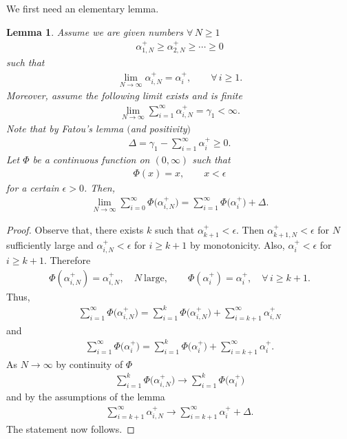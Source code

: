 \documentclass[11pt]{article}
\numberwithin{equation}{section}
\newtheorem{Lemma}[Theorem]{Lemma}
\begin{document}
We first need an elementary lemma.
\begin{Lemma}Assume we are given numbers $\forall\, N \ge 1$
\begin{gather*}
\alpha_{1,N}^+\ge \alpha_{2,N}^+\ge \cdots \ge 0
\end{gather*}
such that
\begin{gather*}
\lim_{N \to \infty}\alpha_{i,N}^+=\alpha_i^+, \qquad \forall\, i\ge 1.
\end{gather*}
Moreover, assume the following limit exists and is finite
\begin{gather*}
\lim_{N\to \infty} \sum_{i=1}^{\infty}\alpha_{i,N}^+=\gamma_1<\infty.
\end{gather*}
Note that by Fatou's lemma $($and positivity$)$
\begin{gather*}
\Delta=\gamma_1-\sum_{i=1}^{\infty}\alpha_i^+\ge 0.
\end{gather*}
Let $\Phi$ be a continuous function on $(0,\infty)$ such that
\begin{gather*}
\Phi(x)=x, \qquad x<\epsilon
\end{gather*}
for a certain $\epsilon>0$. Then,
\begin{gather*}
\lim_{N \to \infty}\sum_{i=0}^{\infty} \Phi\big(\alpha_{i,N}^+\big)=\sum_{i=1}^{\infty} \Phi\big(\alpha_i^+\big)+\Delta.
\end{gather*}
\end{Lemma}

\begin{proof}Observe that, there exists $k$ such that $\alpha_{k+1}^{+}<\epsilon$. Then $\alpha_{k+1,N}^+<\epsilon$ for $N$ sufficiently large and $\alpha_{i,N}^+<\epsilon$ for $i\ge k+1$ by monotonicity. Also, $\alpha_i^+<\epsilon$ for $i\ge k+1$. Therefore
\begin{gather*}
\Phi(\alpha_{i,N}^+)=\alpha_{i,N}^+, \quad N \ \text{large},\qquad \Phi(\alpha_{i}^+)=\alpha_{i}^+, \quad \forall\, i \ge k+1.
\end{gather*}
Thus,
\begin{gather*}
\sum_{i=1}^{\infty}\Phi\big(\alpha_{i,N}^+\big)=\sum_{i=1}^{k}\Phi\big(\alpha_{i,N}^+\big)+\sum_{i=k+1}^{\infty}\alpha_{i,N}^+
\end{gather*}
and
\begin{gather*}
\sum_{i=1}^{\infty}\Phi\big(\alpha_{i}^+\big)=\sum_{i=1}^{k}\Phi\big(\alpha_{i}^+\big)+\sum_{i=k+1}^{\infty}\alpha_{i}^+.
\end{gather*}
As $N \to \infty$ by continuity of $\Phi$
\begin{gather*}
\sum_{i=1}^{k}\Phi\big(\alpha_{i,N}^+\big) \to \sum_{i=1}^{k}\Phi\big(\alpha_{i}^+\big)
\end{gather*}
and by the assumptions of the lemma
\begin{gather*}
\sum_{i=k+1}^{\infty}\alpha_{i,N}^+\to \sum_{i=k+1}^{\infty}\alpha_{i}^++\Delta.
\end{gather*}
The statement now follows.
\end{proof}
\end{document}
